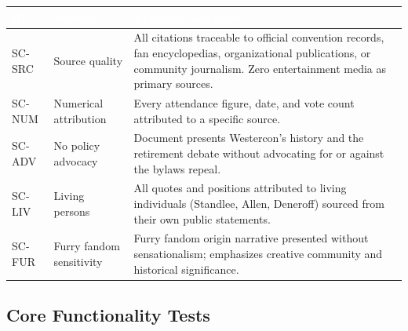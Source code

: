 \documentclass[11pt,letterpaper]{article}
\newcommand{\tableheader}[1]{\textbf{\sffamily\textcolor{white}{#1}}}
\begin{document}
\begin{center}
\begin{tabularx}{\textwidth}{C{1.2cm}L{3cm}X}
\toprule
{}
\tableheader{ID} & \tableheader{Verifies} & \tableheader{Expected Behavior} \\
\midrule
SC-SRC & Source quality & All citations traceable to official convention records, fan encyclopedias, organizational publications, or community journalism. Zero entertainment media as primary sources. \\
SC-NUM & Numerical attribution & Every attendance figure, date, and vote count attributed to a specific source. \\
SC-ADV & No policy advocacy & Document presents Westercon's history and the retirement debate without advocating for or against the bylaws repeal. \\
SC-LIV & Living persons & All quotes and positions attributed to living individuals (Standlee, Allen, Deneroff) sourced from their own public statements. \\
SC-FUR & Furry fandom sensitivity & Furry fandom origin narrative presented without sensationalism; emphasizes creative community and historical significance. \\
\bottomrule
\end{tabularx}
\end{center}

\subsection{Core Functionality Tests}
\end{document}
